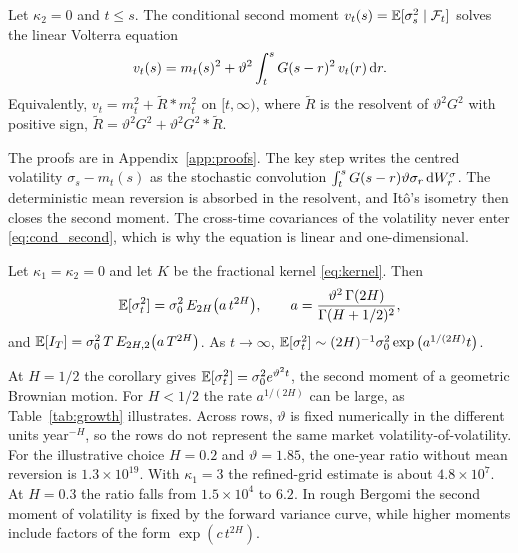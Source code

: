 \begin{proposition}\label{prop:second}
Let $\kappa_2=0$ and $t\le s$. The conditional second moment $v_t(s)=\mathbb{E}[\sigma_s^2\mid\mathcal{F}_t]$ solves the linear Volterra equation
\begin{equation}\label{eq:cond_second}
v_t(s)=m_t(s)^2+\vartheta^2\int_t^sG(s-r)^2\,v_t(r)\,\D r .
\end{equation}
Equivalently, $v_t=m_t^2+\widetilde R*m_t^2$ on $[t,\infty)$, where $\widetilde R$ is the resolvent of $\vartheta^2G^2$ with positive sign, $\widetilde R=\vartheta^2G^2+\vartheta^2G^2*\widetilde R$.
\end{proposition}

The proofs are in Appendix~\ref{app:proofs}. The key step writes the centred volatility $\sigma_s-m_t(s)$ as the stochastic convolution $\int_t^sG(s-r)\vartheta\sigma_r\,\mathrm{d} W^\sigma_r$. The deterministic mean reversion is absorbed in the resolvent, and It\^o's isometry then closes the second moment. The cross-time covariances of the volatility never enter \eqref{eq:cond_second}, which is why the equation is linear and one-dimensional.

\begin{corollary}\label{cor:ml}
Let $\kappa_1=\kappa_2=0$ and let $K$ be the fractional kernel \eqref{eq:kernel}. Then
\begin{equation}\label{eq:ml_second}
\E[\sigma_t^2]=\sigma_0^2\,E_{2H}\big(a\,t^{2H}\big),\qquad a=\frac{\vartheta^2\,\Gamma(2H)}{\Gamma(H+1/2)^2},
\end{equation}
and $\mathbb{E}[I_T]=\sigma_0^2\,T\,E_{2H,2}\big(a\,T^{2H}\big)$. As $t\to\infty$, $\mathbb{E}[\sigma_t^2]\sim(2H)^{-1}\sigma_0^2\exp\big(a^{1/(2H)}t\big)$.
\end{corollary}

At $H=1/2$ the corollary gives $\mathbb{E}[\sigma_t^2]=\sigma_0^2e^{\vartheta^2t}$, the second moment of a geometric Brownian motion. For $H<1/2$ the rate $a^{1/(2H)}$ can be large, as Table~\ref{tab:growth} illustrates. Across rows, $\vartheta$ is fixed numerically in the different units year$^{-H}$, so the rows do not represent the same market volatility-of-volatility. For the illustrative choice $H=0.2$ and $\vartheta=1.85$, the one-year ratio without mean reversion is $1.3\times10^{19}$. With $\kappa_1=3$ the refined-grid estimate is about $4.8\times10^7$. At $H=0.3$ the ratio falls from $1.5\times10^4$ to $6.2$. In rough Bergomi the second moment of volatility is fixed by the forward variance curve, while higher moments include factors of the form $\exp(c\,t^{2H})$.

